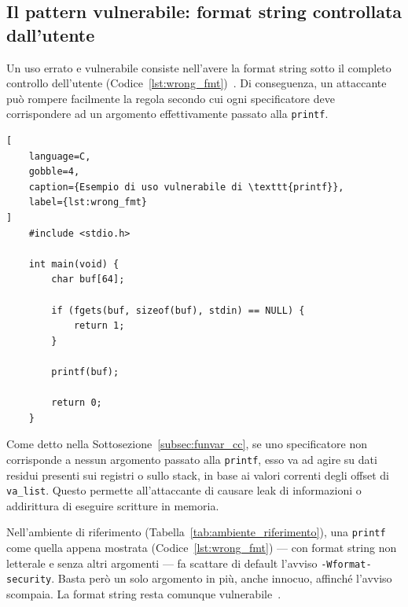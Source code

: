 \subsection{Il pattern vulnerabile: format string controllata dall'utente}\label{subsec:wrong_fmt}
Un uso errato e vulnerabile consiste nell'avere la format string sotto il completo controllo dell'utente (Codice~\ref{lst:wrong_fmt})~\cite{seicertc2016}.
Di conseguenza, un attaccante può rompere facilmente la regola secondo cui ogni specificatore deve corrispondere ad un argomento effettivamente passato alla \texttt{printf}.
\begin{lstlisting}[
    language=C,
    gobble=4,
    caption={Esempio di uso vulnerabile di \texttt{printf}},
    label={lst:wrong_fmt}
]
    #include <stdio.h>

    int main(void) {
        char buf[64];

        if (fgets(buf, sizeof(buf), stdin) == NULL) {
            return 1;
        }

        printf(buf);

        return 0;
    }
\end{lstlisting}
Come detto nella Sottosezione~\ref{subsec:funvar_cc}, se uno specificatore non corrisponde a nessun argomento passato alla \texttt{printf}, esso va ad agire su dati residui presenti sui registri o sullo stack, in base ai valori correnti degli offset di \texttt{va\_list}.
Questo permette all'attaccante di causare leak di informazioni o addirittura di eseguire scritture in memoria.

Nell'ambiente di riferimento (Tabella~\ref{tab:ambiente_riferimento}), una \texttt{printf} come quella appena mostrata (Codice~\ref{lst:wrong_fmt}) --- con format string non letterale e senza altri argomenti --- fa scattare di default l'avviso \texttt{-Wformat-security}. Basta però un solo argomento in più, anche innocuo, affinché l'avviso scompaia. La format string resta comunque vulnerabile~\cite{gccwopts}.


